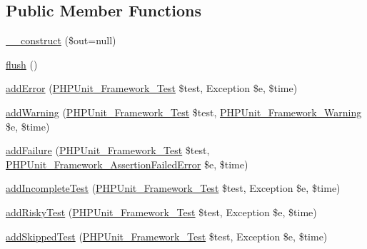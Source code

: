 \subsection*{Public Member Functions}
\begin{DoxyCompactItemize}
\item 
\mbox{\hyperlink{class_p_h_p_unit___util___test_dox___result_printer___x_m_l_a058d0261b18ee18c9fad1ffb1d08775c}{\+\_\+\+\_\+construct}} (\$out=null)
\item 
\mbox{\hyperlink{class_p_h_p_unit___util___test_dox___result_printer___x_m_l_a7751f77b5263bcf940ece6e824a05b38}{flush}} ()
\item 
\mbox{\hyperlink{class_p_h_p_unit___util___test_dox___result_printer___x_m_l_a320d7bc7d2f9264ee7ba7aca6fd2df41}{add\+Error}} (\mbox{\hyperlink{interface_p_h_p_unit___framework___test}{P\+H\+P\+Unit\+\_\+\+Framework\+\_\+\+Test}} \$test, Exception \$e, \$time)
\item 
\mbox{\hyperlink{class_p_h_p_unit___util___test_dox___result_printer___x_m_l_a6c3d134992c5b03573561ef82e7f743d}{add\+Warning}} (\mbox{\hyperlink{interface_p_h_p_unit___framework___test}{P\+H\+P\+Unit\+\_\+\+Framework\+\_\+\+Test}} \$test, \mbox{\hyperlink{class_p_h_p_unit___framework___warning}{P\+H\+P\+Unit\+\_\+\+Framework\+\_\+\+Warning}} \$e, \$time)
\item 
\mbox{\hyperlink{class_p_h_p_unit___util___test_dox___result_printer___x_m_l_a668f17b68705c5c8686bac690a6f719d}{add\+Failure}} (\mbox{\hyperlink{interface_p_h_p_unit___framework___test}{P\+H\+P\+Unit\+\_\+\+Framework\+\_\+\+Test}} \$test, \mbox{\hyperlink{class_p_h_p_unit___framework___assertion_failed_error}{P\+H\+P\+Unit\+\_\+\+Framework\+\_\+\+Assertion\+Failed\+Error}} \$e, \$time)
\item 
\mbox{\hyperlink{class_p_h_p_unit___util___test_dox___result_printer___x_m_l_a81bfe09a62194fe5769ca1cc36ee428b}{add\+Incomplete\+Test}} (\mbox{\hyperlink{interface_p_h_p_unit___framework___test}{P\+H\+P\+Unit\+\_\+\+Framework\+\_\+\+Test}} \$test, Exception \$e, \$time)
\item 
\mbox{\hyperlink{class_p_h_p_unit___util___test_dox___result_printer___x_m_l_ad161e7d13b117cb0af3967cd2adc6bba}{add\+Risky\+Test}} (\mbox{\hyperlink{interface_p_h_p_unit___framework___test}{P\+H\+P\+Unit\+\_\+\+Framework\+\_\+\+Test}} \$test, Exception \$e, \$time)
\item 
\mbox{\hyperlink{class_p_h_p_unit___util___test_dox___result_printer___x_m_l_a1c0cb3bc58e5807530daf3a93783ed4e}{add\+Skipped\+Test}} (\mbox{\hyperlink{interface_p_h_p_unit___framework___test}{P\+H\+P\+Unit\+\_\+\+Framework\+\_\+\+Test}} \$test, Exception \$e, \$time)

\end{DoxyCompactItemize}
